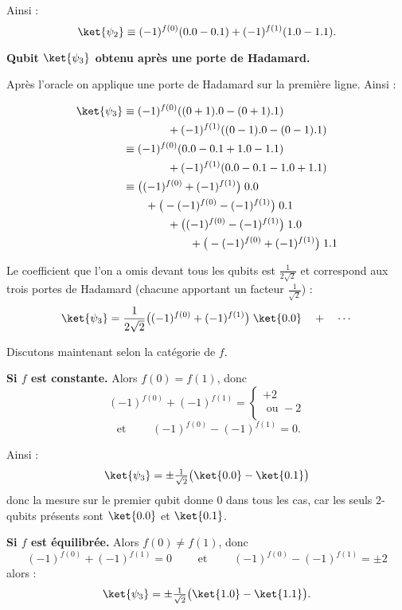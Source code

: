 \documentclass[11pt,class=report,crop=false]{standalone}
\begin{document}
Ainsi :
$$\ket{\psi_2} \equiv (-1)^{f(0)} (0.0 - 0.1) + (-1)^{f(1)} (1.0 - 1.1).$$

\textbf{Qubit $\ket{\psi_3}$ obtenu après une porte de Hadamard.}

Après l'oracle on applique une porte de Hadamard sur la première ligne. 
Ainsi :

\begin{align*}
\ket{\psi_3} 
 &\equiv (-1)^{f(0)} ((0+1).0 - (0+1).1) \\
   & \qquad \qquad + (-1)^{f(1)} ((0-1).0 - (0-1).1) \\
 &\equiv (-1)^{f(0)} (0.0 - 0.1 + 1.0 - 1.1)  \\  
   & \qquad \qquad + (-1)^{f(1)} (0.0 - 0.1 - 1.0 + 1.1) \\
 &\equiv \big((-1)^{f(0)} + (-1)^{f(1)}\big) \; 0.0  \\  
   & \qquad +\big(-(-1)^{f(0)} - (-1)^{f(1)}\big) \; 0.1 \\
   & \qquad \qquad +\big((-1)^{f(0)} - (-1)^{f(1)}\big) \; 1.0 \\   
   & \qquad \qquad \qquad +\big(-(-1)^{f(0)} + (-1)^{f(1)}\big) \; 1.1 \\
\end{align*}

Le coefficient que l'on a omis devant tous les qubits est $\frac{1}{2\sqrt2}$ et correspond aux trois portes de Hadamard (chacune apportant un facteur $\frac{1}{\sqrt2}$) :
$$\ket{\psi_3} = \frac{1}{2\sqrt2}\big((-1)^{f(0)} + (-1)^{f(1)}\big) \; \ket{0.0} \quad + \quad \cdots
$$

Discutons maintenant selon la catégorie de $f$.

\textbf{Si $f$ est constante.}
Alors $f(0)=f(1)$, donc 
$$(-1)^{f(0)} + (-1)^{f(1)} = \left\{ 
\begin{array}{l}
+2 \\
\text{ ou } -2  \\
\end{array}\right.$$
$$\text{ et } \qquad (-1)^{f(0)} - (-1)^{f(1)} = 0.$$

Ainsi :
$$\ket{\psi_3} = \pm\tfrac{1}{\sqrt2} \big( \ket{0.0} - \ket{0.1} \big)$$
donc la mesure sur le premier qubit donne $0$ dans tous les cas, car les seuls $2$-qubits présents sont $\ket{0.0}$ et $\ket{0.1}$.

\textbf{Si $f$ est équilibrée.}
Alors $f(0)\neq f(1)$, donc 
$$(-1)^{f(0)} + (-1)^{f(1)}= 0 \qquad \text{ et }\qquad (-1)^{f(0)} - (-1)^{f(1)} = \pm2$$
alors :
$$\ket{\psi_3} = \pm\tfrac{1}{\sqrt2} \big( \ket{1.0} - \ket{1.1} \big).$$
\end{document}
